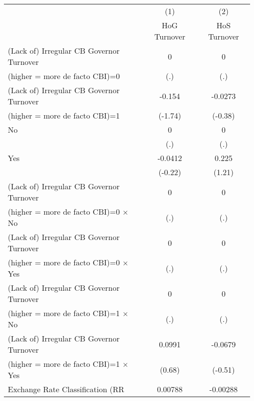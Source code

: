 \begin{table}[htbp]\centering
\def\sym#1{\ifmmode^{#1}\else\(^{#1}\)\fi}
\caption{\label{hoshogmultIndFEDF}}
\begin{tabular}{l*{2}{c}}
\toprule
                                        &\multicolumn{1}{c}{(1)}&\multicolumn{1}{c}{(2)}\\
                                        &\multicolumn{1}{c}{HoG Turnover}&\multicolumn{1}{c}{HoS Turnover}\\
\midrule
(Lack of) Irregular CB Governor Turnover&        0         &        0         \\
(higher = more de facto CBI)=0          &      (.)         &      (.)         \\
\addlinespace
(Lack of) Irregular CB Governor Turnover&   -0.154         &  -0.0273         \\
(higher = more de facto CBI)=1          &  (-1.74)         &  (-0.38)         \\
\addlinespace
No                                      &        0         &        0         \\
                                        &      (.)         &      (.)         \\
\addlinespace
Yes                                     &  -0.0412         &    0.225         \\
                                        &  (-0.22)         &   (1.21)         \\
\addlinespace
(Lack of) Irregular CB Governor Turnover&        0         &        0         \\
(higher = more de facto CBI)=0 $\times$ No&      (.)         &      (.)         \\
\addlinespace
(Lack of) Irregular CB Governor Turnover&        0         &        0         \\
(higher = more de facto CBI)=0 $\times$ Yes&      (.)         &      (.)         \\
\addlinespace
(Lack of) Irregular CB Governor Turnover&        0         &        0         \\
(higher = more de facto CBI)=1 $\times$ No&      (.)         &      (.)         \\
\addlinespace
(Lack of) Irregular CB Governor Turnover&   0.0991         &  -0.0679         \\
(higher = more de facto CBI)=1 $\times$ Yes&   (0.68)         &  (-0.51)         \\
\addlinespace
Exchange Rate Classification (RR        &  0.00788         & -0.00288         \\

\end{tabular}
\end{table}
